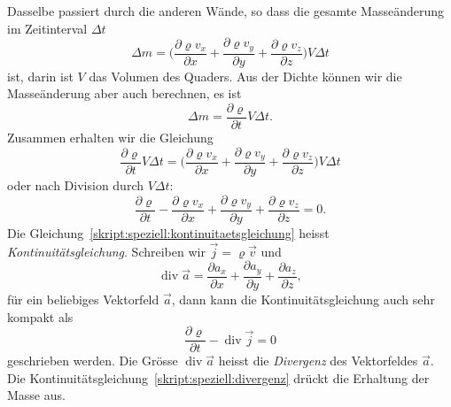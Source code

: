 Dasselbe passiert durch die anderen Wände, so dass
die gesamte Masseänderung im Zeitinterval $\Delta t$
\[
\Delta m
=
\biggl(
\frac{\partial\varrho v_x}{\partial x}
+
\frac{\partial\varrho v_y}{\partial y}
+
\frac{\partial\varrho v_z}{\partial z}
\biggr)V\Delta t
\]
ist, darin ist $V$ das Volumen des Quaders.
Aus der Dichte können wir die Masseänderung aber auch berechnen,
es ist
\[
\Delta m
=
\frac{\partial\varrho}{\partial t}V \Delta t.
\]
Zusammen erhalten wir die Gleichung
\[
\frac{\partial\varrho}{\partial t}V \Delta t
=
\biggl(
\frac{\partial \varrho v_x}{\partial x}
+
\frac{\partial \varrho v_y}{\partial y}
+
\frac{\partial \varrho v_z}{\partial z}
\biggr)V\Delta t
\]
oder nach Division durch $V\Delta t$:
\begin{equation}
\frac{\partial\varrho}{\partial t}
-
\frac{\partial \varrho v_x}{\partial x}
+
\frac{\partial \varrho v_y}{\partial y}
+
\frac{\partial \varrho v_z}{\partial z}
=0.
\label{skript:speziell:kontinuitaetsgleichung}
\end{equation}
Die Gleichung~\eqref{skript:speziell:kontinuitaetsgleichung} heisst
{\em Kontinuitätsgleichung}.
%
Schreiben wir $\vec j = \varrho\vec v$ und
\begin{equation}
\operatorname{div}\vec a
=
\frac{\partial a_x}{\partial x}
+
\frac{\partial a_y}{\partial y}
+
\frac{\partial a_z}{\partial z},
\label{skript:speziell:divergenz}
\end{equation}
für ein beliebiges Vektorfeld $\vec a$,
dann kann die Kontinuitätsgleichung auch sehr kompakt als
\[
\frac{\partial\varrho}{\partial t}-\operatorname{div}\vec j=0
\]
geschrieben werden.
Die Grösse $\operatorname{div}\vec a$ heisst die {\em Divergenz}
des Vektorfeldes $\vec a$.
%
Die Kontinuitätsgleichung~\eqref{skript:speziell:divergenz} drückt
die Erhaltung der Masse aus.

